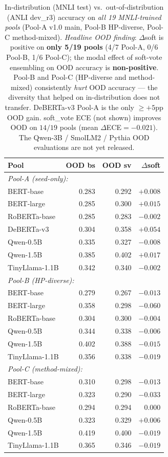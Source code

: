 \documentclass[11pt]{article}
\begin{document}
\begin{table}[h]
\centering
\caption{In-distribution (MNLI test) vs.\ out-of-distribution (ANLI dev\_r3) accuracy on \emph{all 19 MNLI-trained pools} (Pool-A v1.0 main, Pool-B HP-diverse, Pool-C method-mixed). \emph{Headline OOD finding}: $\Delta$soft is positive on \textbf{only 5/19 pools} (4/7 Pool-A, 0/6 Pool-B, 1/6 Pool-C); the modal effect of soft-vote ensembling on OOD accuracy is \textbf{non-positive}. Pool-B and Pool-C (HP-diverse and method-mixed) consistently \emph{hurt} OOD accuracy --- the diversity that helped on in-distribution does not transfer. DeBERTa-v3 Pool-A is the only $\geq{+}5$pp OOD gain. soft\_vote ECE (not shown) improves OOD on $14/19$ pools (mean $\Delta$ECE${=}{-}0.021$). The Qwen-3B / SmolLM2 / Pythia OOD evaluations are not yet released.}
\label{tab:ood}
\small
\setlength{\tabcolsep}{3pt}
\begin{tabular}{@{}lrrr@{}}
\toprule
Pool & OOD bs & OOD sv & $\Delta$soft \\
\midrule
\multicolumn{4}{l}{\emph{Pool-A (seed-only):}} \\
\quad BERT-base          & 0.283 & 0.292 & $+0.008$ \\
\quad BERT-large         & 0.285 & 0.300 & $+0.015$ \\
\quad RoBERTa-base       & 0.285 & 0.283 & $-0.002$ \\
\quad DeBERTa-v3         & 0.304 & 0.358 & $\mathbf{+0.054}$ \\
\quad Qwen-0.5B          & 0.335 & 0.327 & $-0.008$ \\
\quad Qwen-1.5B          & 0.385 & 0.402 & $+0.017$ \\
\quad TinyLlama-1.1B     & 0.342 & 0.340 & $-0.002$ \\
\multicolumn{4}{l}{\emph{Pool-B (HP-diverse):}} \\
\quad BERT-base          & 0.279 & 0.267 & $-0.013$ \\
\quad BERT-large         & 0.358 & 0.298 & $\mathbf{-0.060}$ \\
\quad RoBERTa-base       & 0.304 & 0.300 & $-0.004$ \\
\quad Qwen-0.5B          & 0.344 & 0.338 & $-0.006$ \\
\quad Qwen-1.5B          & 0.402 & 0.388 & $-0.015$ \\
\quad TinyLlama-1.1B     & 0.356 & 0.338 & $-0.019$ \\
\multicolumn{4}{l}{\emph{Pool-C (method-mixed):}} \\
\quad BERT-base          & 0.310 & 0.298 & $-0.013$ \\
\quad BERT-large         & 0.323 & 0.290 & $-0.033$ \\
\quad RoBERTa-base       & 0.294 & 0.294 & $\;\;0.000$ \\
\quad Qwen-0.5B          & 0.323 & 0.329 & $+0.006$ \\
\quad Qwen-1.5B          & 0.419 & 0.400 & $-0.019$ \\
\quad TinyLlama-1.1B     & 0.365 & 0.346 & $-0.019$ \\
\bottomrule
\end{tabular}
\end{table}
\end{document}
